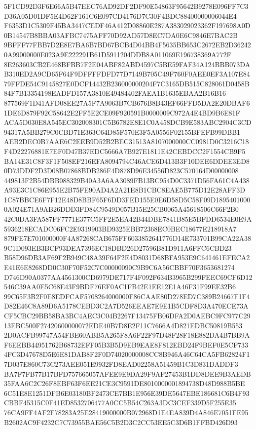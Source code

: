 \documentclass[UTF8,fontset=fandol,zihao=-4,a4paper]{ctexart}
\begin{document}
{{5F1CD92D3F6E66A5B47EEC76AD92DF2DF90E54863F95642B9278E096FF7C3D36A05D01DF5E4D62F161C6E097CD4176D7C30F4BDC88400000006044E4
F6353D1C5309F45BA3447CEDF46A412D08860E287A383029023362F197698A0D0B14547B8BBA03AFBC7475AFF70D92AD57D8EC7DA0E6C9846E7BAC2B
9BFFF77FBB7D2E8E7BA6B7BD67BCB4D04BB4F5635BB653C2672EB2D362420A99000000E023A9E222291B61D5911204DDB8A011069E196738369A772F
8E263603CB2E468BFBB7F2E04ABF82ABD4597C5BE59FAF34A124BBB073DAB310ED2A9CD65F64F9DFFFFDFD77D7149B705C49F760F0AEE0EF3A107E84
79FFDE54C9145827E0DCF14432B236000000204F7C3165DB515C828061D0458B84F7B13354198EADFD157A3810E49484402FAEA1B1635EBAA2B16B16
877569F1D41AFD08EE27A5F7A9063B7CB676B8B43EF66FFD5DA2E20DBAF61DE6D879F92C58642E2FF5E2CE09F920591B0000009C972A4E4BD9B6E81F
ACA5D030E8A545EC302008301C5B6782E8E1C0A458DCB9E583ABC2904C3CD94317A5BB279C0CBD71E363C64D85F570E3F5A0556F02155BFEFB99DBB1
AEB2DEC0B7AAE6C2EEB9D52B2BEC31513A8107000000CC0981D0C3216C18F4D22276881E7EF0D47B37EDC5666A7B927E1811E42CEBDCC2F1554CB9F5
BA14E31C8F3F1F508EF216EFA8094794C46ACE6D413B3F10DEE6DDEE3ED80D73DDF2D3D08B07868BDB286F4D878D96E34556D823C570164D00000008
449813F2B54DBB088329B40A3A6AA3089FB13BC954D0C3371D56FA61C4A438A93E3C1C86E955E2B75FE90AD4A2A21E8B1CBC8EAE5B775D12E28AFF3D
1C87BBCE6F7F12E48D8BBF65F6DD3FED155E0E6D58D5C58F09D18954010000A024E71A9AB26DDD3FD84C9549D057B15E25CB0065A45618506C66F2B0
42C0DA3FA587FF7771E377C5FF2E5EA42B44DBE7841B85E5BFDD6534E0E9A5936218ECADC06FC2E9319903BD9325EBB72368EC0BEC18677E218918A7
879FE7E701000000F4A87268CAB675FF6033852641776D14E733701B99CA22A389C1D093EB3BCF93DEA7396EC18DBD26D27596B81D911A6FFC6CBD23
B58D96DB3AF69F2B949C48A39F64F2E4D8031D68BFA953E9C641461EFECA2E41E6E8268DD0C30F70F52C7C00000090C9B9C6A56CBBF70F3653681274
D746D90A0377AA4561300CD6979DE717F4F092F634B3965B299FEEC69CF6D12546C39AA0E5C68E43F9BDF76EF0AC1FB42E1EE12E1A46F31F99EE32B6
99C65F3B2F0E8EDFCAF5708264000000F86CAAE80D278ED7C389B24667F1F4D82E46C8A89D6A5178CEBD3C2A7D526EEAE7E9E1B5CDF8D3A470ECE73A
CF5CBC29BB58BA3BC4AEC3C04B2267F13475FB06DFA2D0AEBC9FC977C2913EBC500F27420600000072EDE40B7D8E2F11C7666A4D821EDBC50819B553
2D0ACFB99747A54FBE60ABB5A265F8A6F22F97D48F28F18E882DA4B7BB9AF6EEBB44951762B68732EFF05B3B5D9EB9EAE8F812EBD24F9BEF0E5CF733
4FC3D47678D5E6E81DAB8F2F0D74020000008CC8B946A46C64CA5FB62824F17D037E860C73C273AEE051E9932FD8EAD02258A51459B1C3D831DADDF3
BA7F7FB77B17BFD757665057AFEE9E9DA29F9AF27453B1DD8DEE9B3AEDB35FAA6C2C26F8EBF63F6EE21CE3C9591DE8010000001894738D48D988B5BE
6C51E8E1251DFB6E03180BF2473CE7BB1E956E39DE5647EBE186681C6B4F93CBBF45315C0F41ED8532706477A0CC5B54C263A3DC3CEF339D5F255E35
76CA9FF4AF2F78283A25E28419000000B072968D1E4EA839D4A846E7051FE95B2602AC9F4232C7C73955BAE56C5B2D3C2CC53EE5C3D6B1FFBD426D93
}}
\end{document}

